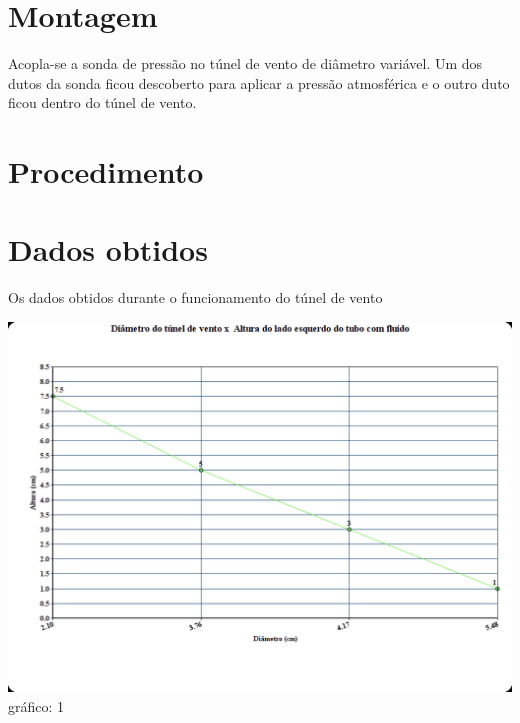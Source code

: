 \documentclass[a4paper]{article}
\begin{document}
\section{Montagem}
    Acopla-se a sonda de pressão no túnel de vento de diâmetro variável. Um dos dutos da sonda ficou descoberto para aplicar a pressão atmosférica e o outro duto ficou dentro do túnel de vento.

\section{Procedimento}

\section{Dados obtidos}
    Os dados obtidos durante o funcionamento do túnel de vento
    \begin{center}
          \includegraphics[width=\linewidth]{img/graphHeight.png}
          \label{graph}{gráfico: 1}
    \end{center}
\end{document}
